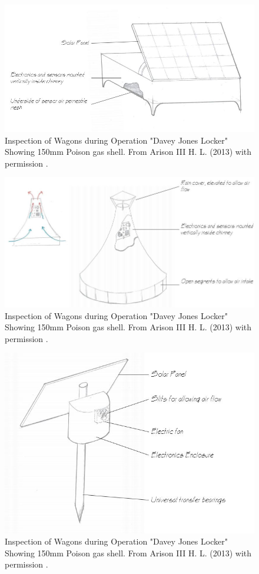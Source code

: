 \begin{figure}[H]
\centering
\includegraphics[width=0.8\linewidth]{Engineering_hardware/Engineering_hardware_Figures/Concept_box.JPG}
\caption{Inspection of Wagons during Operation "Davey Jones Locker" Showing 150mm Poison gas shell. From Arison III H. L. (2013) with permission \cite{arison2014european}.  }
\label{fig:15cm_shell_loading}
\end{figure}


\begin{figure}[H]
\centering
\includegraphics[width=0.8\linewidth]{Engineering_hardware/Engineering_hardware_Figures/Concept_chimney.JPG}
\caption{Inspection of Wagons during Operation "Davey Jones Locker" Showing 150mm Poison gas shell. From Arison III H. L. (2013) with permission \cite{arison2014european}.  }
\label{fig:15cm_shell_loading}
\end{figure}


\begin{figure}[H]
\centering
\includegraphics[width=0.6\linewidth]{Engineering_hardware/Engineering_hardware_Figures/Concept_stake.JPG}
\caption{Inspection of Wagons during Operation "Davey Jones Locker" Showing 150mm Poison gas shell. From Arison III H. L. (2013) with permission \cite{arison2014european}.  }
\label{fig:15cm_shell_loading}
\end{figure}

